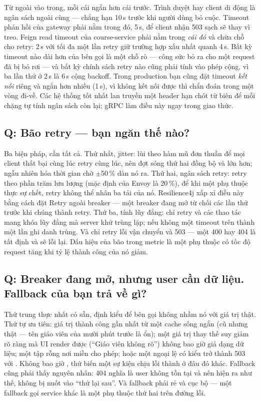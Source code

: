 Từ ngoài vào trong, mỗi cái ngắn hơn cái trước. Trình duyệt hay client
di động là ngân sách ngoài cùng --- chẳng hạn 10\,s trước khi người
dùng bỏ cuộc. Timeout phản hồi của gateway phải nằm trong đó, 5\,s, để
client nhận 503 sạch sẽ thay vì treo. Feign read timeout của
course-service phải nằm trong \emph{cái đó} và chừa chỗ cho retry:
2\,s với tối đa một lần retry giữ trường hợp xấu nhất quanh 4\,s. Bất
kỳ timeout nào dài hơn của bên gọi là một chỗ rò --- công sức bỏ ra cho
một request đã bị bỏ rơi --- và bất kỳ chính sách retry nào cũng phải
tính vào phép cộng, vì ba lần thử ở 2\,s là 6\,s cộng backoff. Trong
production bạn cũng đặt timeout \emph{kết nối} riêng và ngắn hơn nhiều
(1\,s), vì không kết nối được thì chẩn đoán trong một vòng đi-về. Các
hệ thống tốt nhất lan truyền một header hạn chót từ biên để mỗi chặng
tự tính ngân sách còn lại; gRPC làm điều này ngay trong giao thức.

\subsection*{Q: Bão retry --- bạn ngăn thế nào?}

Ba biện pháp, cần tất cả. Thứ nhất, jitter: lùi theo hàm mũ đơn thuần
để mọi client thất bại cùng lúc retry cùng lúc, nên đợt sóng thứ hai
đồng bộ và lớn hơn; ngẫu nhiên hóa thời gian chờ $\pm$50\,\% dàn nó
ra. Thứ hai, ngân sách retry: retry theo phần trăm lưu lượng (mặc định
của Envoy là 20\,\%), để khi một phụ thuộc thực sự chết, retry không
thể nhân ba tải của nó. Resilience4j xấp xỉ điều này bằng cách đặt
Retry ngoài breaker --- một breaker đang mở từ chối các lần thử trước
khi chúng thành retry. Thứ ba, tính lũy đẳng: chỉ retry  và
các thao tác mang khóa lũy đẳng mà server khử trùng lặp; nếu không một
timeout trên  thành một lần ghi danh trùng. Và chỉ retry lỗi
vận chuyển và 503 --- một 400 hay 404 là tất định và sẽ lỗi lại. Dấu
hiệu của bão trong metric là một phụ thuộc có tốc độ request tăng khi
tỷ lệ thành công của nó giảm.

\subsection*{Q: Breaker đang mở, nhưng user cần dữ liệu. Fallback của bạn trả về gì?}

Thứ trung thực nhất có sẵn, định kiểu để bên gọi không nhầm nó với giá
trị thật. Thứ tự ưu tiên: giá trị thành công gần nhất từ một cache sống
ngắn (cũ nhưng thật --- tên giáo viên của mười phút trước là ổn); một
giá trị thay thế suy giảm rõ ràng mà UI render được (``Giáo viên không
rõ'') không bao giờ giả dạng dữ liệu; một tập rỗng nơi miền cho phép;
hoặc một ngoại lệ có kiểu trở thành 503 với . Không
bao giờ , thứ biến một sự kiện chịu lỗi thành
 ở đâu đó khác. Fallback cũng phải thấy
nguyên nhân: 404 nghĩa là user không tồn tại và nên hiện ra như thế,
không bị nuốt vào ``thử lại sau''. Và fallback phải rẻ và cục bộ ---
một fallback gọi service khác là một phụ thuộc thứ hai trên đường lỗi.


